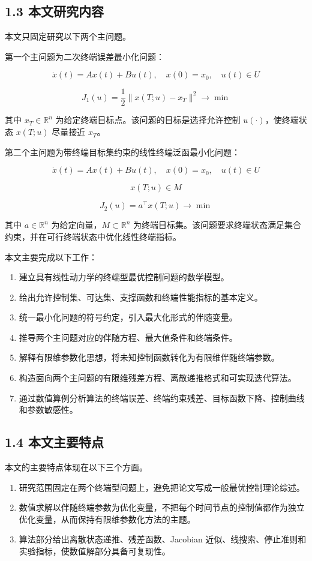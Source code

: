 \documentclass[UTF8,a4paper,zihao=-4]{ctexart}
\begin{document}
\subsection{1.3 本文研究内容}

本文只固定研究以下两个主问题。

第一个主问题为二次终端误差最小化问题：

\[
\dot{x}(t)=Ax(t)+Bu(t),\quad x(0)=x_0,\quad u(t)\in U
\]

\[
J_1(u)=\frac{1}{2}\|x(T;u)-x_T\|^2\to\min
\]

其中 $x_T\in\mathbb{R}^n$ 为给定终端目标点。该问题的目标是选择允许控制 $u(\cdot)$，使终端状态 $x(T;u)$ 尽量接近 $x_T$。

第二个主问题为带终端目标集约束的线性终端泛函最小化问题：

\[
\dot{x}(t)=Ax(t)+Bu(t),\quad x(0)=x_0,\quad u(t)\in U
\]

\[
x(T;u)\in M
\]

\[
J_2(u)=a^\top x(T;u)\to\min
\]

其中 $a\in\mathbb{R}^n$ 为给定向量，$M\subset\mathbb{R}^n$ 为终端目标集。该问题要求终端状态满足集合约束，并在可行终端状态中优化线性终端指标。

本文主要完成以下工作：

\begin{enumerate}
\item 建立具有线性动力学的终端型最优控制问题的数学模型。
\item 给出允许控制集、可达集、支撑函数和终端性能指标的基本定义。
\item 统一最小化问题的符号约定，引入最大化形式的伴随变量。
\item 推导两个主问题对应的伴随方程、最大值条件和终端条件。
\item 解释有限维参数化思想，将未知控制函数转化为有限维伴随终端参数。
\item 构造面向两个主问题的有限维残差方程、离散递推格式和可实现迭代算法。
\item 通过数值算例分析算法的终端误差、终端约束残差、目标函数下降、控制曲线和参数敏感性。
\end{enumerate}

\subsection{1.4 本文主要特点}

本文的主要特点体现在以下三个方面。

\begin{enumerate}
\item 研究范围固定在两个终端型问题上，避免把论文写成一般最优控制理论综述。
\item 数值求解以伴随终端参数为优化变量，不把每个时间节点的控制值都作为独立优化变量，从而保持有限维参数化方法的主题。
\item 算法部分给出离散状态递推、残差函数、Jacobian 近似、线搜索、停止准则和实验指标，使数值解部分具备可复现性。
\end{enumerate}
\end{document}
